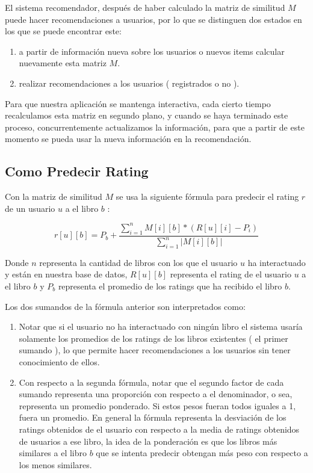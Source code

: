 \documentclass[14pt]{extarticle}
\begin{document}
El sistema recomendador, después de haber calculado la matriz de similitud $M$ puede hacer recomendaciones a usuarios, por lo que se distinguen dos estados en los que se puede encontrar este:

\begin{enumerate}
    \item a partir de información nueva sobre los usuarios o nuevos items calcular nuevamente esta matriz $M$.
    \item realizar recomendaciones a los usuarios ( registrados o no ).
\end{enumerate}

Para que nuestra aplicación se mantenga interactiva, cada cierto tiempo recalculamos esta matriz en segundo plano, y cuando se haya terminado este proceso, concurrentemente actualizamos la información, para que a partir de este momento se pueda usar la nueva información en la recomendación.


\subsection{Como Predecir Rating}  

Con la matriz de similitud $M$ se usa la siguiente fórmula para predecir el rating $r$ de un usuario $u$ a el libro $b$ :

$$r[u][b] = P_b + \frac{\sum_{i = 1}^n M[i][b]*(R[u][i] - P_i)}{\sum_{i = 1}^n | M[i][b] | }$$

Donde $n$ representa la cantidad de libros con los que el usuario $u$ ha interactuado y están en nuestra base de datos, $R[u][b]$ representa el rating de el usuario $u$ a el libro $b$ y $P_b$ representa el promedio de los ratings que ha recibido el libro $b$.

Los dos sumandos de la fórmula anterior son interpretados como:

\begin{enumerate}
    \item Notar que si el usuario no ha interactuado con ningún libro el sistema usaría solamente  los promedios de los ratings de los libros existentes ( el primer sumando ), lo que permite hacer recomendaciones a los usuarios sin tener conocimiento de ellos.
    \item Con respecto a la segunda fórmula, notar que el segundo factor de cada sumando representa una proporción con respecto a el denominador, o sea, representa un promedio ponderado. Si estos pesos fueran todos iguales a 1, fuera un promedio. En general la fórmula representa la desviación de los ratings obtenidos de el usuario con respecto a la media de ratings obtenidos de usuarios a ese libro, la idea de la ponderación es que los libros más similares a el libro $b$ que se intenta predecir obtengan más peso con respecto a los menos similares. 
\end{enumerate}
\end{document}
